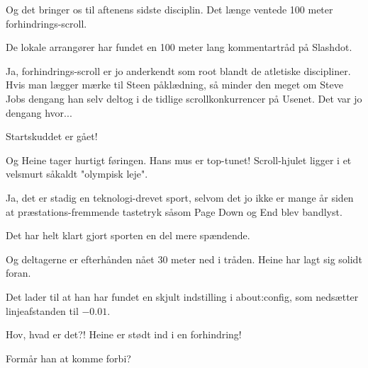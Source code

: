 \documentclass[a4paper,11pt]{article}
\begin{document}
\begin{sketch}


   Og det bringer os til aftenens sidste disciplin. Det længe ventede
  100 meter forhindrings-scroll.


   De lokale arrangører har fundet en 100 meter lang kommentartråd på
  Slashdot.

   Ja, forhindrings-scroll er jo anderkendt som root blandt
  de atletiske discipliner.  Hvis man lægger mærke til Steen
  påklædning, så minder den meget om Steve Jobs dengang han selv
  deltog i de tidlige scrollkonkurrencer på Usenet.  Det var jo
  dengang hvor...


   Startskuddet er gået!

   Og Heine tager hurtigt føringen. Hans mus er top-tunet!
  Scroll-hjulet ligger i et velsmurt såkaldt "olympisk leje".

   Ja, det er stadig en teknologi-drevet sport, selvom det jo
  ikke er mange år siden at præstations-fremmende tastetryk såsom Page
  Down og End blev bandlyst.

   Det har helt klart gjort sporten en del mere spændende.

   Og deltagerne er efterhånden nået 30 meter ned i tråden. Heine har
  lagt sig solidt foran.

   Det lader til at han har fundet en skjult indstilling i
  about:config, som nedsætter linjeafstanden til $-0.01$.


   Hov, hvad er det?! Heine er stødt ind i en forhindring!


   Formår han at komme forbi?



\end{sketch}
\end{document}
